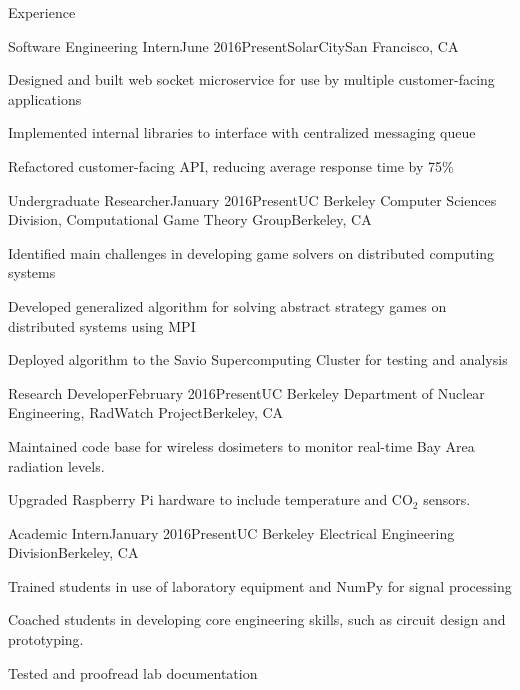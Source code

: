 \documentclass{resume} %
\begin{document}
\begin{rSection}{Experience}
\begin{rSubsection}{Software Engineering Intern}{June 2016\textminus Present}{SolarCity}{San Francisco, CA}
\item[] Designed and built web socket microservice for use by multiple customer-facing applications
\item[] Implemented internal libraries to interface with centralized messaging queue
\item[] Refactored customer-facing API, reducing average response time by 75\%
\end{rSubsection}
\begin{rSubsection}{Undergraduate Researcher}{January 2016\textminus Present}{UC Berkeley Computer Sciences Division, Computational Game Theory Group}{Berkeley, CA}
\item[] Identified main challenges in developing game solvers on distributed computing systems
\item[] Developed generalized algorithm for solving abstract strategy games on distributed systems using MPI
\item[] Deployed algorithm to the Savio Supercomputing Cluster for testing and analysis
\end{rSubsection}
\begin{rSubsection}{Research Developer}{February 2016\textminus Present}{UC Berkeley Department of Nuclear Engineering, RadWatch Project}{Berkeley, CA}
\item[] Maintained code base for wireless dosimeters to monitor real-time Bay Area radiation levels.
\item[] Upgraded Raspberry Pi hardware to include temperature and CO$_2$ sensors. 
\end{rSubsection}
\begin{rSubsection}{Academic Intern}{January 2016\textminus Present}{UC Berkeley Electrical Engineering Division}{Berkeley, CA}
\item[] Trained students in use of laboratory equipment and NumPy for signal processing
\item[] Coached students in developing core engineering skills, such as circuit design and prototyping.
\item[] Tested and proofread lab documentation
\end{rSubsection}
\end{rSection}

\end{document}
